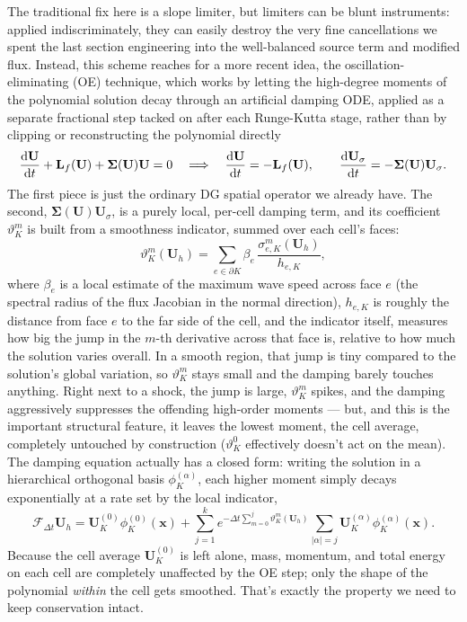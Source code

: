 The traditional fix here is a slope limiter, but limiters can be blunt instruments: applied indiscriminately, they can easily destroy the very fine cancellations we spent the last section engineering into the well-balanced source term and modified flux. Instead, this scheme reaches for a more recent idea, the oscillation-eliminating (OE) technique, which works by letting the high-degree moments of the polynomial solution decay through an artificial damping ODE, applied as a separate fractional step tacked on after each Runge-Kutta stage, rather than by clipping or reconstructing the polynomial directly
\[
	\dv{\mathbf{U}}{t} + \mathbf{L}_f(\mathbf{U}) + \mathbf{\Sigma}(\mathbf{U})\mathbf{U} = 0
	\quad\Longrightarrow\quad
	\dv{\mathbf{U}}{t} = -\mathbf{L}_f(\mathbf{U}), \qquad \dv{\mathbf{U}_\sigma}{t} = -\mathbf{\Sigma}(\mathbf{U})\mathbf{U}_\sigma.
\]
The first piece is just the ordinary DG spatial operator we already have. The second, $\mathbf{\Sigma}(\mathbf{U})\mathbf{U}_\sigma$, is a purely local, per-cell damping term, and its coefficient $\vartheta_K^m$ is built from a smoothness indicator, summed over each cell's faces:
\[
	\vartheta_K^m(\mathbf{U}_h) = \sum_{e\in\partial K} \beta_e\, \frac{\sigma_{e,K}^m(\mathbf{U}_h)}{h_{e,K}},
\]
where $\beta_e$ is a local estimate of the maximum wave speed across face $e$ (the spectral radius of the flux Jacobian in the normal direction), $h_{e,K}$ is roughly the distance from face $e$ to the far side of the cell, and the indicator itself,
measures how big the jump in the $m$-th derivative across that face is, relative to how much the solution varies overall. In a smooth region, that jump is tiny compared to the solution's global variation, so $\vartheta_K^m$ stays small and the damping barely touches anything. Right next to a shock, the jump is large, $\vartheta_K^m$ spikes, and the damping aggressively suppresses the offending high-order moments — but, and this is the important structural feature, it leaves the lowest moment, the cell average, completely untouched by construction ($\vartheta_K^0$ effectively doesn't act on the mean). The damping equation actually has a closed form: writing the solution in a hierarchical orthogonal basis $\phi_K^{(\alpha)}$, each higher moment simply decays exponentially at a rate set by the local indicator,
\[
	\mathcal{F}_{\Delta t}\mathbf{U}_h = \mathbf{U}_K^{(0)}\phi_K^{(0)}(\mathbf{x}) + \sum_{j=1}^k e^{-\Delta t \sum_{m=0}^j \vartheta_K^m(\mathbf{U}_h)} \sum_{|\alpha|=j} \mathbf{U}_K^{(\alpha)}\phi_K^{(\alpha)}(\mathbf{x}).
\]
Because the cell average $\mathbf{U}_K^{(0)}$ is left alone, mass, momentum, and total energy on each cell are completely unaffected by the OE step; only the shape of the polynomial \emph{within} the cell gets smoothed. That's exactly the property we need to keep conservation intact.

